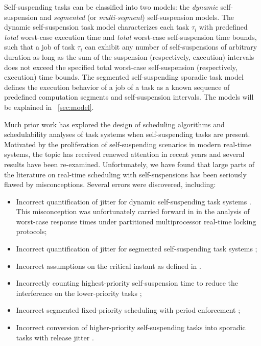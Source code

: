 Self-suspending tasks can be classified into two models: the \emph{dynamic} self-suspension and \emph{segmented} (or \emph{multi-segment}) self-suspension models.
The dynamic self-suspension %
task model characterizes each
task $\tau_i$ with predefined \emph{total} worst-case execution time and \emph{total} worst-case self-suspension time bounds, such that a job of task $\tau_i$ can exhibit any number of self-suspensions of arbitrary duration as long as the sum of the suspension (respectively, execution) intervals does not exceed the specified total worst-case self-suspension (respectively, execution) time bounds. The segmented self-suspending sporadic task model defines the execution behavior of a job of a task as a known sequence of predefined computation segments and self-suspension intervals.  The models will be explained in \mysectionref{}~\ref{sec:model}.

Much prior work has explored the design of scheduling algorithms and schedulability analyses of task systems when self-suspending tasks are present. Motivated by the proliferation of self-suspending scenarios in modern real-time systems, the topic has received renewed attention in recent years and several results have been re-examined. Unfortunately, we have found that large parts of the literature on real-time scheduling with self-suspensions has been seriously flawed by misconceptions. Several errors were discovered, including: 
\begin{itemize}
\item Incorrect quantification of jitter for dynamic self-suspending
  task systems
  \cite{ECRTS-AudsleyB04,RTAS-AudsleyB04,RTCSA-KimCPKH95,MingLiRTCSA1994}.  This
  misconception was unfortunately carried forward in \cite{zeng-2011,bbb-2013,yang-2013,kim-2014,han-2014,carminati-2014,yang-2014,lakshmanan-2009} in the analysis of worst-case response times under
  partitioned multiprocessor real-time locking protocols;
\item Incorrect quantification of jitter for segmented self-suspending
  task systems \cite{RTCSA-BletsasA05};
\item Incorrect assumptions on the critical instant as defined in \cite{LR:rtas10}.
\item Incorrectly counting highest-priority self-suspension time to reduce the
  interference on the lower-priority tasks  \cite{RTSS-KimANR13}; 
\item Incorrect segmented fixed-priority scheduling with period
  enforcement \cite{RTSS-KimANR13,DBLP:journals/ieicet/DingTT09};
\item Incorrect conversion of higher-priority self-suspending tasks into sporadic tasks with release jitter \cite{ecrts15nelissen}.
\end{itemize}


